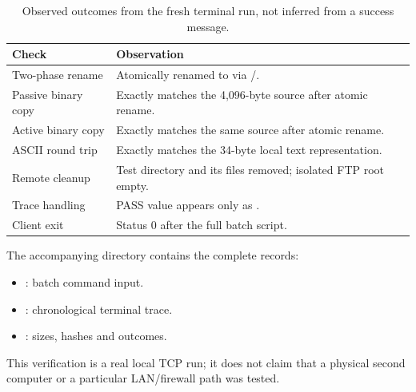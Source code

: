 \begin{table}[htbp]
\centering\small
\caption{Observed outcomes from the fresh terminal run, not inferred from a success message.}
\label{tab:terminal-outcomes}
\begin{tabularx}{\linewidth}{@{}l Y@{}}
\toprule
Check & Observation \\
\midrule
Two-phase rename & Atomically renamed  to  via /. \\
Passive binary copy & Exactly matches the 4,096-byte source after atomic rename. \\
Active binary copy & Exactly matches the same source after atomic rename. \\
ASCII round trip & Exactly matches the 34-byte local text representation. \\
Remote cleanup & Test directory and its files removed; isolated FTP root empty. \\
Trace handling & PASS value appears only as . \\
Client exit & Status 0 after the full batch script. \\
\bottomrule
\end{tabularx}
\end{table}

The accompanying  directory contains the complete records:
\begin{itemize}[nosep]
\item {}: batch command input.
\item {}: chronological terminal trace.
\item {}: sizes, hashes and outcomes.
\end{itemize}
This verification is a real local TCP run; it does not claim that a physical second computer or a particular LAN/firewall path was tested.
